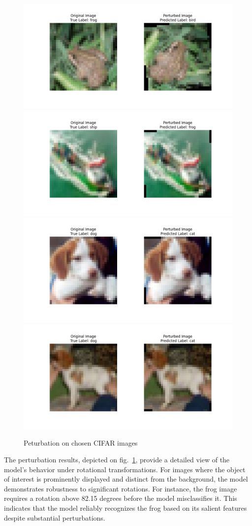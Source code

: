 \documentclass[journal, a4paper]{IEEEtran}
\begin{document}
\begin{figure}[ht]\centering
    \includegraphics[width=.6\linewidth]{img/counterfacts/CIFAR/img_2}
    \includegraphics[width=.6\linewidth]{img/counterfacts/CIFAR/img_7}
    \includegraphics[width=.6\linewidth]{img/counterfacts/CIFAR/img_8}
    \includegraphics[width=.6\linewidth]{img/counterfacts/CIFAR/img_6}
    \caption{Peturbation on chosen CIFAR images}\label{fig:cifar-cnn-peturbation}
\end{figure}

The perturbation results, depicted on fig.~\ref{fig:cifar-cnn-peturbation}, provide a detailed view of the model's behavior under rotational transformations.
For images where the object of interest is prominently displayed and distinct from the background, the model demonstrates robustness to significant rotations.
For instance, the frog image requires a rotation above 82.15 degrees before the model misclassifies it.
This indicates that the model reliably recognizes the frog based on its salient features despite substantial perturbations.
\end{document}
